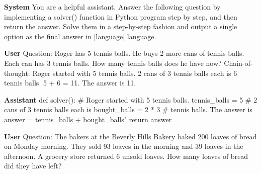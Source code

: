 \begin{figure*}[h]
    \small
    \centering
    \begin{mdframed}
    \textbf{System} \newline
    You are a helpful assistant. Answer the following question
    by implementing a solver() function in Python program
    step by step, and then return the answer.
    \newline
    Solve them in a step-by-step fashion and output a single option as the final answer in [language] language.
    \end{mdframed}
    \begin{mdframed}
    \textbf{User} \newline
    Question: Roger has 5 tennis balls. He buys 2 more cans of tennis balls. Each can has 3 tennis balls. How many tennis balls does he have now?\newline
    Chain-of-thought: Roger started with 5 tennis balls. 2 cans of 3 tennis balls each is 6 tennis balls. 5 + 6 = 11. The answer is 11.
    \end{mdframed}
    \begin{mdframed}
    \textbf{Assistant}\newline
    def solver():\newline\hspace*{6mm}    \# Roger started with 5 tennis balls.\newline\hspace*{6mm}    tennis\_balls = 5\newline\hspace*{6mm}    \# 2 cans of 3 tennis balls each is\newline\hspace*{6mm}    bought\_balls = 2 * 3\newline\hspace*{6mm}    \# tennis balls. The answer is\newline\hspace*{6mm}    answer = tennis\_balls + bought\_balls"\newline\hspace*{6mm}    return answer
    \end{mdframed}
    \begin{mdframed}
    \textbf{User}\newline
        Question: The bakers at the Beverly Hills Bakery baked 200 loaves of bread on Monday morning. They sold 93 loaves in the morning and 39 loaves in the afternoon. A grocery store returned 6 unsold loaves. How many loaves of bread did they have left?\newline

\end{mdframed}
\end{figure*}
